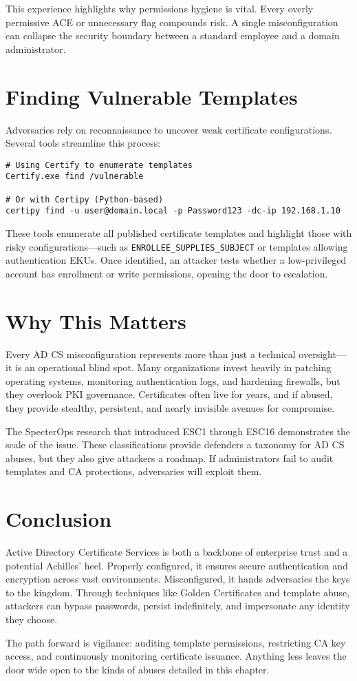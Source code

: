 This experience highlights why permissions hygiene is vital. Every overly permissive ACE or unnecessary flag compounds risk. A single misconfiguration can collapse the security boundary between a standard employee and a domain administrator.

\section{Finding Vulnerable Templates}

Adversaries rely on reconnaissance to uncover weak certificate configurations. Several tools streamline this process:

\begin{verbatim}
# Using Certify to enumerate templates
Certify.exe find /vulnerable

# Or with Certipy (Python-based)
certipy find -u user@domain.local -p Password123 -dc-ip 192.168.1.10
\end{verbatim}

These tools enumerate all published certificate templates and highlight those with risky configurations—such as \texttt{ENROLLEE\_SUPPLIES\_SUBJECT} or templates allowing authentication EKUs. Once identified, an attacker tests whether a low-privileged account has enrollment or write permissions, opening the door to escalation.

\section{Why This Matters}

Every AD CS misconfiguration represents more than just a technical oversight—it is an operational blind spot. Many organizations invest heavily in patching operating systems, monitoring authentication logs, and hardening firewalls, but they overlook PKI governance. Certificates often live for years, and if abused, they provide stealthy, persistent, and nearly invisible avenues for compromise.

The SpecterOps research that introduced ESC1 through ESC16 demonstrates the scale of the issue. These classifications provide defenders a taxonomy for AD CS abuses, but they also give attackers a roadmap. If administrators fail to audit templates and CA protections, adversaries will exploit them.

\section{Conclusion}

Active Directory Certificate Services is both a backbone of enterprise trust and a potential Achilles’ heel. Properly configured, it ensures secure authentication and encryption across vast environments. Misconfigured, it hands adversaries the keys to the kingdom. Through techniques like Golden Certificates and template abuse, attackers can bypass passwords, persist indefinitely, and impersonate any identity they choose.

The path forward is vigilance: auditing template permissions, restricting CA key access, and continuously monitoring certificate issuance. Anything less leaves the door wide open to the kinds of abuses detailed in this chapter.
